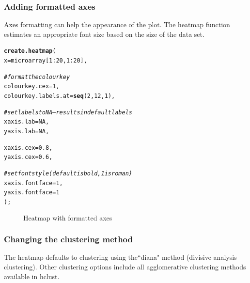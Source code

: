 \documentclass[letterpaper]{article}\usepackage[]{graphicx}\usepackage[]{color}
\makeatletter
\newcommand{\hlnum}[1]{\textcolor[rgb]{0.686,0.059,0.569}{#1}}%
\newcommand{\hlcom}[1]{\textcolor[rgb]{0.678,0.584,0.686}{\textit{#1}}}%
\newcommand{\hlopt}[1]{\textcolor[rgb]{0,0,0}{#1}}%
\newcommand{\hlstd}[1]{\textcolor[rgb]{0.345,0.345,0.345}{#1}}%
\newcommand{\hlkwc}[1]{\textcolor[rgb]{0.333,0.667,0.333}{#1}}%
\newcommand{\hlkwd}[1]{\textcolor[rgb]{0.737,0.353,0.396}{\textbf{#1}}}%
\newenvironment{kframe}{%
 \def\at@end@of@kframe{}%
 \ifinner\ifhmode%
  \def\at@end@of@kframe{\end{minipage}}%
  \begin{minipage}{\columnwidth}%
 \fi\fi%
 \def\FrameCommand##1{\hskip\@totalleftmargin \hskip-\fboxsep
 \colorbox{shadecolor}{##1}\hskip-\fboxsep
     \hskip-\linewidth \hskip-\@totalleftmargin \hskip\columnwidth}%
 \MakeFramed {\advance\hsize-\width
   \@totalleftmargin\z@ \linewidth\hsize
   \@setminipage}}%
 {\par\unskip\endMakeFramed%
 \at@end@of@kframe}
\newenvironment{knitrout}{}{} %
\makeatother
\begin{document}
\subsubsection{Adding formatted axes}
Axes formatting can help the appearance of the plot. The heatmap function estimates an appropriate font size based on the size of the data set.
\begin{knitrout}
\color{fgcolor}\begin{kframe}
\begin{alltt}
\hlkwd{create.heatmap}\hlstd{(}
    \hlkwc{x} \hlstd{= microarray[}\hlnum{1}\hlopt{:}\hlnum{20}\hlstd{,} \hlnum{1}\hlopt{:}\hlnum{20}\hlstd{],}

    \hlcom{# format the colour key}
    \hlkwc{colourkey.cex} \hlstd{=} \hlnum{1}\hlstd{,}
    \hlkwc{colourkey.labels.at} \hlstd{=} \hlkwd{seq}\hlstd{(}\hlnum{2}\hlstd{,} \hlnum{12}\hlstd{,} \hlnum{1}\hlstd{),}

    \hlcom{# set labels to NA -- results in default labels}
    \hlkwc{xaxis.lab} \hlstd{=} \hlnum{NA}\hlstd{,}
    \hlkwc{yaxis.lab} \hlstd{=} \hlnum{NA}\hlstd{,}

    \hlkwc{xaxis.cex} \hlstd{=} \hlnum{0.8}\hlstd{,}
    \hlkwc{yaxis.cex} \hlstd{=} \hlnum{0.6}\hlstd{,}

    \hlcom{# set font style (default is bold, 1 is roman)}
    \hlkwc{xaxis.fontface} \hlstd{=} \hlnum{1}\hlstd{,}
    \hlkwc{yaxis.fontface} \hlstd{=} \hlnum{1}
    \hlstd{);}
\end{alltt}
\end{kframe}\begin{figure}

{\centering {} 

}

\caption[Heatmap with formatted axes]{Heatmap with formatted axes\label{fig:heatmap2}}
\end{figure}


\end{knitrout}

\subsubsection{Changing the clustering method}
The heatmap defaults to clustering using the``diana" method (divisive analysis clustering). Other clustering options include all agglomerative clustering methods available in hclust.
\end{document}

